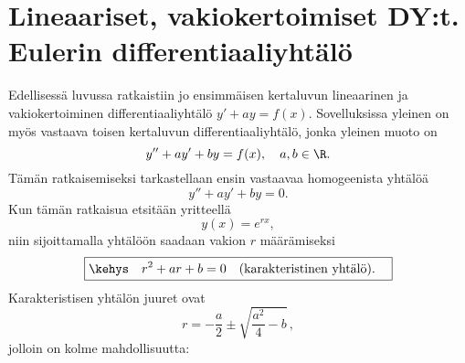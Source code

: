 \section{Lineaariset, vakiokertoimiset DY:t.  \\ Eulerin differentiaaliyhtälö} 
\label{vakikertoimiset ja Eulerin DYt}
\alku
{}

Edellisessä luvussa ratkaistiin jo ensimmäisen kertaluvun lineaarinen ja vakiokertoiminen
differentiaaliyhtälö $y'+ay=f(x)$. Sovelluksissa yleinen on myös vastaava toisen kertaluvun
differentiaaliyhtälö, jonka yleinen muoto on
\begin{equation} \label{linvak-ty}
y''+ay'+by=f(x), \quad a,b\in\R.
\end{equation}
Tämän ratkaisemiseksi tarkastellaan ensin vastaavaa homogeenista yhtälöä
\begin{equation} \label{linvak-hy}
y''+ay'+by=0.
\end{equation}
Kun tämän ratkaisua etsitään yritteellä
\[
y(x)=e^{rx},
\]
niin sijoittamalla yhtälöön saadaan vakion $r$ määrämiseksi
%
\[
\boxed{\kehys\quad r^2+ar+b=0 \quad\text{(karakteristinen yhtälö).}\quad}
\]
Karakteristisen yhtälön juuret ovat
\[
r=-\frac{a}{2}\pm\sqrt{\frac{a^2}{4}-b}\,,
\]
jolloin on kolme mahdollisuutta:

